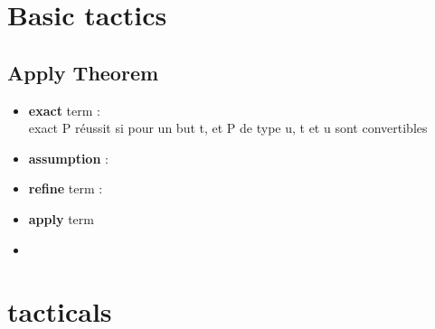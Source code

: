 \documentclass[a4paper, 10pt]{article}
\begin{document}
\setlength{\grammarparsep}{15pt plus 1pt minus 1pt} %
\setlength{\grammarindent}{7em} %
\renewcommand{\syntleft}{}
\renewcommand{\syntright}{}



\section {Basic tactics}
\subsection{Apply Theorem}
\begin{itemize}
\item \textbf{exact} term :\\
  exact P réussit si pour un but t, et P de type u, t et u sont convertibles
\item \textbf{assumption} :
  
\item  \textbf{refine} term :

\item \textbf{apply} term

\item  

\end{itemize}




\newpage
\section{tacticals}
\end{document}
